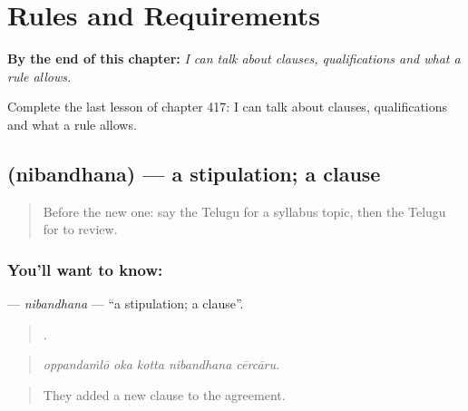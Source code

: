 
\chapter{Rules and Requirements}
\label{ch:te-rules-and-requirements}

\begin{chapteropening}
\textbf{By the end of this chapter:} \emph{I can talk about clauses, qualifications and what a rule allows.}

Complete the last lesson of chapter 417: I can talk about clauses, qualifications and what a rule allows.
\end{chapteropening}

\section[\texorpdfstring{\te{నిబంధన} (nibandhana)}{నిబంధన (nibandhana)}]{ (nibandhana) — a stipulation; a clause}

\label{lesson:TE-C417-nibandhana}



\begin{quote}
Before the new one: say the Telugu for a syllabus topic, then the Telugu for to review.
\end{quote}

\subsection*{You'll want to know: }
\textbf{} — \emph{nibandhana} — \textquotedblleft{}a stipulation; a clause\textquotedblright{}.

\begin{quote}
    .
\end{quote}

\begin{quote}
\emph{oppandaṁlō oka kotta nibandhana cērcāru.}
\end{quote}

\begin{quote}
They added a new clause to the agreement.
\end{quote}

